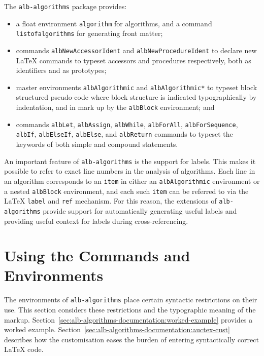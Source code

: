 \documentclass[11pt,a4paper,oneside,titlepage]{alb-latex}
\begin{document}
The \texttt{alb-algorithms} package provides:
\begin{itemize}
\item a float environment \texttt{algorithm} for algorithms, and a
  command \texttt{listofalgorithms} for generating front matter;
\item commands \texttt{albNewAccessorIdent} and
  \texttt{albNewProcedureIdent} to declare new \LaTeX{} commands to
  typeset accessors and procedures respectively, both as identifiers and
  as prototypes;
\item master environments \texttt{albAlgorithmic} and
  \texttt{albAlgorithmic*} to typeset block structured pseudo-code where
  block structure is indicated typographically by indentation, and in
  mark up by the \texttt{albBlock} environment; and
\item commands \texttt{albLet}, \texttt{albAssign}, \texttt{albWhile},
  \texttt{albForAll}, \texttt{albForSequence}, \texttt{albIf},
  \texttt{albElseIf}, \texttt{albElse}, and \texttt{albReturn} commands
  to typeset the keywords of both simple and compound statements.
\end{itemize}

An important feature of \texttt{alb-algorithms} is the support for
labels.  This makes it possible to refer to exact line numbers in the
analysis of algorithms.  Each line in an algorithm corresponds to an
\texttt{item} in either an \texttt{albAlgorithmic} environment or a
nested \texttt{albBlock} environment, and each such \texttt{item} can be
referred to via the \LaTeX{} \texttt{label} and \texttt{ref} mechanism.
For this reason, the \AUCTeX{} extensions of \texttt{alb-algorithms}
provide support for automatically generating useful labels and providing
useful context for labels during cross-referencing.




\section{Using the Commands and Environments}
\label{sec:alb-algorithms-documentation:using-comm-envir}

The environments of \texttt{alb-algorithms} place certain syntactic
restrictions on their use.  This section considers these restrictions
and the typographic meaning of the markup.
Section~\ref{sec:alb-algorithms-documentation:worked-example} provides a
worked example.
Section~\ref{sec:alb-algorithms-documentation:auctex-cust} describes how
the \AUCTeX{} customisation eases the burden of entering syntactically
correct \LaTeX{} code.
\end{document}
